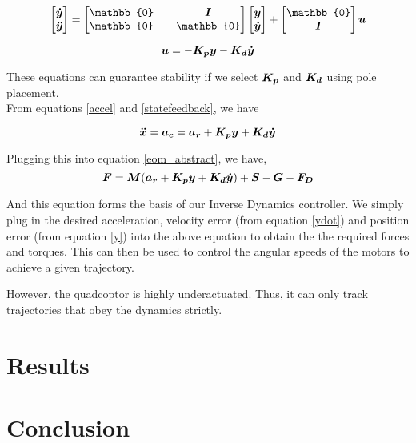 \documentclass[12pt,fleqn]{article}
\newcommand{\mbm}[1]{\mbox{\boldmath $#1$}}
\begin{document}
\begin{equation} \label{y_dynamics}
$$ \begin{bmatrix} \mbm{\dot{y}} \\ \mbm{\ddot{y}} \end{bmatrix}
= \begin{bmatrix} \mathbb{0} && \mbm{I} \\ \mathbb{0} &&
  \mathbb{0} \end{bmatrix} \begin{bmatrix} \mbm{y} \\
  \mbm{\dot{y}}\end{bmatrix} + \begin{bmatrix} \mathbb{0}  \\
  \mbm{I} \end{bmatrix} \mbm{u}$$
\end{equation}

\begin{equation} \label{statefeedback}
$$ \mbm{u} = -\mbm{K_p}\mbm{y} - \mbm{K_d}\mbm{\dot{y}} $$
\end{equation}

These equations can guarantee stability if we select $\mbm{K_p}$ and
$\mbm{K_d}$ using pole placement.\\

From equations \ref{accel} and \ref{statefeedback}, we have

$$ \mbm{\ddot{x}} = \mbm{a_c} = \mbm{a_r} + \mbm{K_p}\mbm{y} +
\mbm{K_d}\mbm{\dot{y}} $$

Plugging this into equation \ref{eom_abstract}, we have,
\begin{equation} \label{eom_id}
$$ \mbm{F} = \mbm{M}(\mbm{a_r} + \mbm{K_p}\mbm{y} +
\mbm{K_d}\mbm{\dot{y}}) + \mbm{S} -\mbm{G} - \mbm{F_D} $$
\end{equation}

And this equation forms the basis of our Inverse Dynamics
controller. We simply plug in the desired acceleration, velocity error
(from equation \ref{ydot}) and position error (from
equation \ref{y}) into the above equation to obtain the the required
forces and torques. This can then be used to control the angular
speeds of the motors to achieve a given trajectory. 

However, the quadcoptor is highly underactuated. Thus, it can only
track trajectories that obey the dynamics strictly.


\section{Results}

\section{Conclusion}




\end{document}

